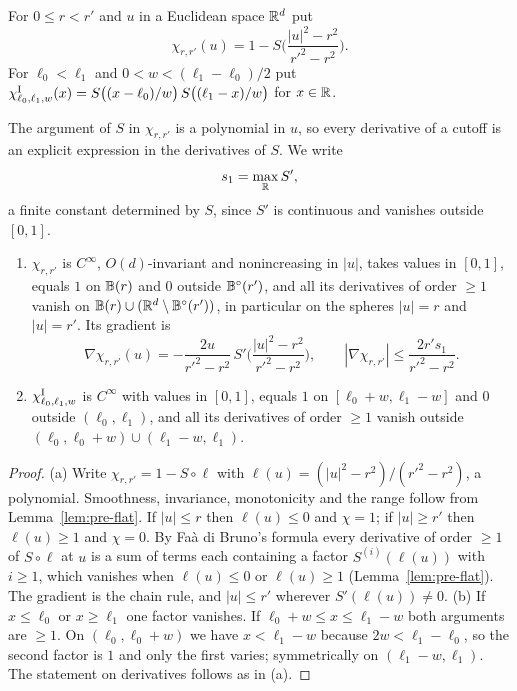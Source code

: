 \begin{definition}\label{def:pre-cutoff}
For $0\le r<r'$ and $u$ in a Euclidean space $\mathbb{R}^d$ put
\[
 \chi_{r,r'}(u)=1-S\Big(\frac{|u|^2-r^2}{r'^2-r^2}\Big).
\]
For $\ell_0<\ell_1$ and $0<w<(\ell_1-\ell_0)/2$ put
$\chi^{\rm I}_{\ell_0,\ell_1,w}(x)=S\big((x-\ell_0)/w\big)\,S\big((\ell_1-x)/w\big)$ for $x\in\mathbb{R}$.
\end{definition}

The argument of $S$ in $\chi_{r,r'}$ is a polynomial in $u$, so every derivative of a cutoff is an
explicit expression in the derivatives of $S$. We write
\[
 s_1=\max_{\mathbb{R}}S' ,
\]
a finite constant determined by $S$, since $S'$ is continuous and vanishes outside $[0,1]$.

\begin{lemma}[Cutoffs]\label{lem:pre-cutoff}
\begin{enumerate}[label=(\alph*)]
\item $\chi_{r,r'}$ is $C^\infty$, $O(d)$-invariant and nonincreasing in $|u|$, takes values in $[0,1]$, equals $1$
on $\mathbb{B}(r)$ and $0$ outside $\mathbb{B}^\circ(r')$, and all its derivatives of order $\ge1$ vanish on
$\mathbb{B}(r)\cup(\mathbb{R}^d\setminus\mathbb{B}^\circ(r'))$, in particular on the spheres $|u|=r$ and $|u|=r'$. Its gradient is
\[
 \nabla\chi_{r,r'}(u)=-\frac{2u}{r'^2-r^2}\,S'\Big(\frac{|u|^2-r^2}{r'^2-r^2}\Big),\qquad
 |\nabla\chi_{r,r'}|\le\frac{2r's_1}{r'^2-r^2}.
\]
\item $\chi^{\rm I}_{\ell_0,\ell_1,w}$ is $C^\infty$ with values in $[0,1]$, equals $1$ on $[\ell_0+w,\ell_1-w]$ and $0$ outside
$(\ell_0,\ell_1)$, and all its derivatives of order $\ge1$ vanish outside $(\ell_0,\ell_0+w)\cup(\ell_1-w,\ell_1)$.
\end{enumerate}
\end{lemma}

\begin{proof}
(a) Write $\chi_{r,r'}=1-S\circ\ell$ with $\ell(u)=(|u|^2-r^2)/(r'^2-r^2)$, a polynomial. Smoothness, invariance,
monotonicity and the range follow from Lemma~\ref{lem:pre-flat}. If $|u|\le r$ then $\ell(u)\le0$ and $\chi=1$; if
$|u|\ge r'$ then $\ell(u)\ge1$ and $\chi=0$. By Fa\`a di Bruno's formula every derivative of order $\ge1$ of
$S\circ\ell$ at $u$ is a sum of terms each containing a factor $S^{(i)}(\ell(u))$ with $i\ge1$, which vanishes when
$\ell(u)\le0$ or $\ell(u)\ge1$ (Lemma~\ref{lem:pre-flat}). The gradient is the chain rule, and $|u|\le r'$ wherever
$S'(\ell(u))\ne0$.
(b) If $x\le\ell_0$ or $x\ge\ell_1$ one factor vanishes. If $\ell_0+w\le x\le\ell_1-w$ both arguments are $\ge1$. On
$(\ell_0,\ell_0+w)$ we have $x<\ell_1-w$ because $2w<\ell_1-\ell_0$, so the second factor is $1$ and only the first varies;
symmetrically on $(\ell_1-w,\ell_1)$. The statement on derivatives follows as in (a).
\end{proof}

